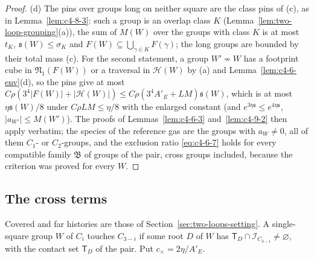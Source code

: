 \begin{proof}
(d) The pins over groups long on neither square are the class pins of (c), as in Lemma~\ref{lem:c4-8-3}: such a group is an overlap class $K$ (Lemma~\ref{lem:two-loop-grouping}(a)), the sum of $M(W)$ over the groups with class $K$ is at most $t_K$, $\mathfrak s(W)\leq\sigma_K$ and $F(W)\subseteq\bigcup_{\gamma\in K}F(\gamma)$; the long groups are bounded by their total mass (c). For the second statement, a group $W'\not\sim W$ has a footprint cube in $\mathfrak N_1(F(W))$ or a traversal in $\mathcal H(W)$ by (a) and Lemma~\ref{lem:c4-6-env}(d), so the pins give at most $C\rho(3^4|F(W)|+|\mathcal H(W)|)\leq C\rho(3^4A'_E+LM)\mathfrak s(W)$, which is at most $\eta\mathfrak s(W)/8$ under $C\rho LM\leq\eta/8$ with the enlarged constant (and $e^{3\eta\mathfrak s}\leq e^{4\eta\mathfrak s}$, $|a_{W'}|\leq M(W')$). The proofs of Lemmas~\ref{lem:c4-6-3} and~\ref{lem:c4-9-2} then apply verbatim; the species of the reference gas are the groups with $a_W\neq0$, all of them $C_1$- or $C_2$-groups, and the exclusion ratio \eqref{eq:c4-6-7} holds for every compatible family $\mathfrak B$ of groups of the pair, cross groups included, because the criterion was proved for every $W$.
\end{proof}

\subsection{The cross terms}\label{sec:two-loops-cross}
Covered and far histories are those of Section~\ref{sec:two-loops-setting}. A single-square group $W$ of $C_i$ touches $C_{3-i}$ if some root $D$ of $W$ has $\mathsf T_D\cap\mathcal I_{C_{3-i}}\neq\varnothing$, with the contact set $\mathsf T_D$ of the pair. Put $c_\times=2\eta/A'_E$.

